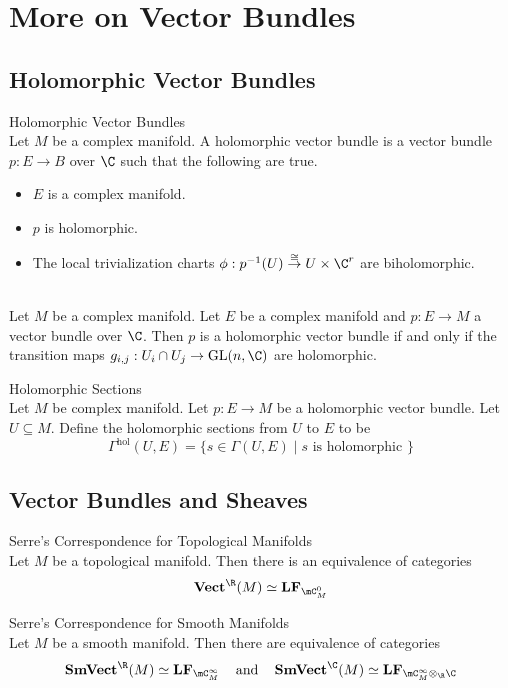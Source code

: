 \documentclass[a4paper]{article}
\begin{document}
\pagebreak
\section{More on Vector Bundles}
\subsection{Holomorphic Vector Bundles}
\begin{defn}{Holomorphic Vector Bundles}{}\\
Let $M$ be a complex manifold. A holomorphic vector bundle is a vector bundle $p:E\to B$ over $\C$ such that the following are true. 
\begin{itemize}
\item $E$ is a complex manifold. 
\item $p$ is holomorphic. 
\item The local trivialization charts $\phi:p^{-1}(U)\overset{\cong}{\to}U\times\C^r$ are biholomorphic. 
\end{itemize}
\end{defn}

\begin{prp}{}{}\\
Let $M$ be a complex manifold. Let $E$ be a complex manifold and $p:E\to M$ a vector bundle over $\C$. Then $p$ is a holomorphic vector bundle if and only if the transition maps $g_{i,j}:U_i\cap U_j\to\text{GL}(n,\C)$ are holomorphic. 
\end{prp}

\begin{defn}{Holomorphic Sections}{}\\
Let $M$ be complex manifold. Let $p:E\to M$ be a holomorphic vector bundle. Let $U\subseteq M$. Define the holomorphic sections from $U$ to $E$ to be $$\Gamma^\text{hol}(U,E)=\{s\in\Gamma(U,E)\;|\;s\text{ is holomorphic }\}$$
\end{defn}

\subsection{Vector Bundles and Sheaves}
\begin{thm}{Serre's Correspondence for Topological Manifolds}{}\\
Let $M$ be a topological manifold. Then there is an equivalence of categories $$\bold{Vect}^\R(M)\simeq\bold{LF}_{\mC_M^0}$$
\end{thm}

\begin{thm}{Serre's Correspondence for Smooth Manifolds}{}\\
Let $M$ be a smooth manifold. Then there are equivalence of categories $$\bold{SmVect}^\R(M)\simeq\bold{LF}_{\mC_M^\infty}\;\;\;\text{ and }\;\;\;\bold{SmVect}^\C(M)\simeq\bold{LF}_{\mC_M^\infty\otimes_\R\C}$$
\end{thm}
\end{document}
